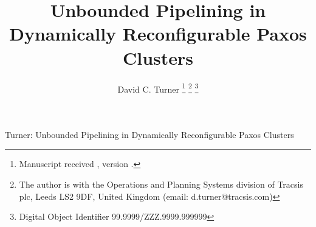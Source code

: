 \documentclass[journal]{IEEEtran}
\def\mytitle{Unbounded Pipelining in Dynamically Reconfigurable Paxos Clusters}
\begin{document}
%
\title{\mytitle}
%
%
%

\author{David C. Turner%
\thanks{Manuscript received \pubdate, version \gitid.}%
\thanks{The author is with the Operations and Planning Systems division of
Tracsis plc, Leeds LS2 9DF, United Kingdom (email:
d.turner@tracsis.com)}%
\thanks{Digital Object Identifier 99.9999/ZZZ.9999.999999}
}

% 
%



{Turner: \mytitle}
% 
\end{document}
